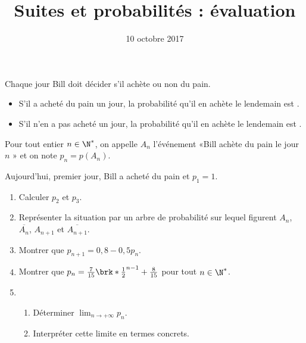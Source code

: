 \documentclass[12pt,french,a4paper]{article}
\title{Suites et probabilités : évaluation \no{2} }
\date{10 octobre 2017}
\author{}
\begin{document}
\maketitle
\thispagestyle{fancy}

\begin{center}

\end{center}

\begin{question}
  Chaque jour Bill doit décider s'il achète ou non du pain.
  \begin{itemize}
    \item S'il a acheté du pain un jour, la probabilité qu'il en achète le
      lendemain est .
    \item S'il n'en a pas acheté un jour, la probabilité qu'il en achète le
      lendemain est .
  \end{itemize}
  Pour tout entier $n \in \N^*$, on appelle $A_n$ l'événement «Bill achète
  du pain le jour $n$ » et on note $p_n = p(A_n)$.

  Aujourd'hui, premier jour, Bill a acheté du pain et $p_1 = 1$.
  \begin{enumerate}
    \item Calculer $p_2$ et $p_3$.
    \item Représenter la situation par un arbre de probabilité sur lequel
      figurent $A_n$, $\overline{A_n}$, $A_{n+1}$ et $\overline{A_{n+1}}$.
    \item Montrer que $p_{n+1} = 0,8 - 0,5 p_n$.
    \item Montrer que $p_n = \frac7{15} \brk*{\frac12}^{n-1} + \frac8{15}$
      pour tout $n \in \N^*$.
    \item \begin{enumerate}
      \item Déterminer $\lim_{n\to+\infty} p_n$.
      \item Interpréter cette limite en termes concrets.
    \end{enumerate}
  \end{enumerate}
\end{question}
\end{document}
